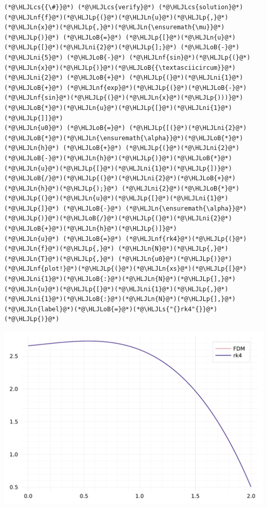 \documentclass[12pt,a4paper]{article}
\newcommand{\HLJLn}[1]{#1}
\newcommand{\HLJLnf}[1]{\textcolor[RGB]{66,102,213}{#1}}
\newcommand{\HLJLs}[1]{\textcolor[RGB]{201,61,57}{#1}}
\newcommand{\HLJLni}[1]{\textcolor[RGB]{59,151,46}{#1}}
\newcommand{\HLJLoB}[1]{\textcolor[RGB]{102,102,102}{\textbf{#1}}}
\newcommand{\HLJLp}[1]{#1}
\newcommand{\HLJLcs}[1]{\textcolor[RGB]{153,153,119}{\textit{#1}}}
\begin{document}
\begin{lstlisting}
(*@\HLJLcs{{\#}}@*) (*@\HLJLcs{verify}@*) (*@\HLJLcs{solution}@*)
(*@\HLJLnf{f}@*)(*@\HLJLp{(}@*)(*@\HLJLn{u}@*)(*@\HLJLp{,}@*)(*@\HLJLn{x}@*)(*@\HLJLp{,}@*)(*@\HLJLn{\ensuremath{\mu}}@*)(*@\HLJLp{)}@*) (*@\HLJLoB{=}@*) (*@\HLJLp{[}@*)(*@\HLJLn{u}@*)(*@\HLJLp{[}@*)(*@\HLJLni{2}@*)(*@\HLJLp{];}@*) (*@\HLJLoB{-}@*)(*@\HLJLni{5}@*) (*@\HLJLoB{-}@*) (*@\HLJLnf{sin}@*)(*@\HLJLp{(}@*)(*@\HLJLn{x}@*)(*@\HLJLp{)}@*)(*@\HLJLoB{{\textasciicircum}}@*)(*@\HLJLni{2}@*) (*@\HLJLoB{+}@*) (*@\HLJLp{(}@*)(*@\HLJLni{1}@*) (*@\HLJLoB{+}@*) (*@\HLJLnf{exp}@*)(*@\HLJLp{(}@*)(*@\HLJLoB{-}@*)(*@\HLJLnf{sin}@*)(*@\HLJLp{(}@*)(*@\HLJLn{x}@*)(*@\HLJLp{)))}@*)(*@\HLJLoB{*}@*)(*@\HLJLn{u}@*)(*@\HLJLp{[}@*)(*@\HLJLni{1}@*)(*@\HLJLp{]]}@*)
(*@\HLJLn{u0}@*) (*@\HLJLoB{=}@*) (*@\HLJLp{[(}@*)(*@\HLJLni{2}@*)(*@\HLJLoB{*}@*)(*@\HLJLn{\ensuremath{\alpha}}@*)(*@\HLJLoB{*}@*)(*@\HLJLn{h}@*) (*@\HLJLoB{+}@*) (*@\HLJLp{(}@*)(*@\HLJLni{2}@*)(*@\HLJLoB{-}@*)(*@\HLJLn{h}@*)(*@\HLJLp{)}@*)(*@\HLJLoB{*}@*)(*@\HLJLn{u}@*)(*@\HLJLp{[}@*)(*@\HLJLni{1}@*)(*@\HLJLp{])}@*)(*@\HLJLoB{/}@*)(*@\HLJLp{(}@*)(*@\HLJLni{2}@*)(*@\HLJLoB{+}@*)(*@\HLJLn{h}@*)(*@\HLJLp{);}@*) (*@\HLJLni{2}@*)(*@\HLJLoB{*}@*)(*@\HLJLp{(}@*)(*@\HLJLn{u}@*)(*@\HLJLp{[}@*)(*@\HLJLni{1}@*)(*@\HLJLp{]}@*) (*@\HLJLoB{-}@*) (*@\HLJLn{\ensuremath{\alpha}}@*)(*@\HLJLp{)}@*)(*@\HLJLoB{/}@*)(*@\HLJLp{(}@*)(*@\HLJLni{2}@*)(*@\HLJLoB{+}@*)(*@\HLJLn{h}@*)(*@\HLJLp{)]}@*)
(*@\HLJLn{u}@*) (*@\HLJLoB{=}@*) (*@\HLJLnf{rk4}@*)(*@\HLJLp{(}@*)(*@\HLJLn{f}@*)(*@\HLJLp{,}@*) (*@\HLJLn{N}@*)(*@\HLJLp{,}@*) (*@\HLJLn{T}@*)(*@\HLJLp{,}@*) (*@\HLJLn{u0}@*)(*@\HLJLp{)}@*)
(*@\HLJLnf{plot!}@*)(*@\HLJLp{(}@*)(*@\HLJLn{xs}@*)(*@\HLJLp{[}@*)(*@\HLJLni{1}@*)(*@\HLJLoB{:}@*)(*@\HLJLn{N}@*)(*@\HLJLp{],}@*) (*@\HLJLn{u}@*)(*@\HLJLp{[}@*)(*@\HLJLni{1}@*)(*@\HLJLp{,}@*)(*@\HLJLni{1}@*)(*@\HLJLoB{:}@*)(*@\HLJLn{N}@*)(*@\HLJLp{],}@*) (*@\HLJLn{label}@*)(*@\HLJLoB{=}@*)(*@\HLJLs{"{}rk4"{}}@*)(*@\HLJLp{)}@*)
\end{lstlisting}

\includegraphics[width=\linewidth]{figures/ass_4_report_10_1.pdf}
\end{document}
